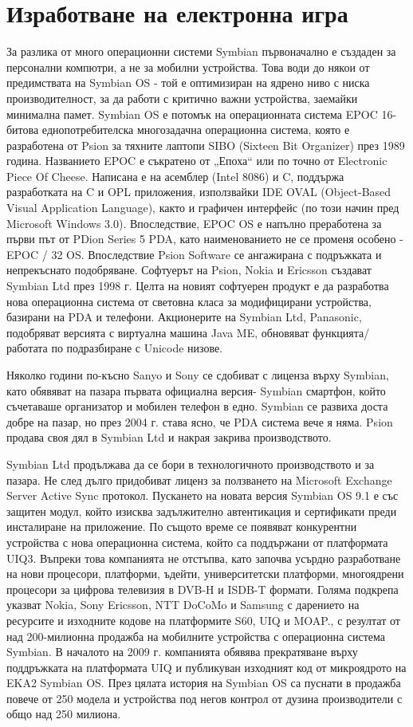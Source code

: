﻿\newpage
\chapter{Изработване на електронна игра}
\label{chapter02}

За разлика от много операционни системи Symbian първоначално е създаден за персонални компютри, а не за мобилни устройства. Това води до някои от предимствата на Symbian OS - той е оптимизиран на ядрено ниво с ниска производителност, за да работи с критично важни устройства, заемайки минимална памет. Symbian OS е потомък на операционната система EPOC 16-битова еднопотребителска многозадачна операционна система, която е разработена от Psion за тяхните лаптопи SIBO (Sixteen Bit Organizer) през 1989 година. Названието EPOC е съкратено от „Епоха“ или по точно от Electronic Piece Of Cheese. Написана е на асемблер (Intel 8086) и C, поддържа разработката на C и OPL приложения, използвайки IDE OVAL (Object-Based Visual Application Language), както и графичен интерфейс (по този начин пред Microsoft Windows 3.0). Впоследствие, EPOC OS е напълно преработена за първи път от PDion Series 5 PDA, като наименованието не се променя особено - EPOC / 32 OS. Впоследствие Psion Software се ангажирана с подръжката и непрекъснато подобряване. Софтуерът на Psion, Nokia и Ericsson създават Symbian Ltd през 1998 г. Целта на новият софтуерен продукт е да разработва нова операционна система от световна класа за модифицирани устройства, базирани на PDA и телефони. Акционерите на Symbian Ltd, Panasonic, подобряват версията с виртуална машина Java ME, обновяват функцията/работата по подразбиране с Unicode низове.

Няколко години по-късно Sanyo и Sony се сдобиват с лиценза върху Symbian, като обявяват на пазара първата официална версия- Symbian смартфон, който съчетаваше организатор и мобилен телефон в едно. Symbian се развиха доста добре на пазар, но през 2004 г. става ясно, че PDA  система вече я няма. Psion продава своя дял в Symbian Ltd и накрая закрива производството. 

Symbian Ltd продължава да се бори в технологичното производството и за пазара. Не след дълго придобиват лиценз за ползването на Microsoft Exchange Server Active Sync протокол. Пускането на новата версия Symbian OS 9.1 е със защитен модул, който изисква задължително автентикация и сертификати преди инсталиране на приложение. По същото време се появяват  конкурентни устройства с нова операционна система, който са поддържани от платформата UIQ3. Въпреки това компанията не отстъпва, като започва усърдно разработване на нови процесори, платформи, ъдейти, университетски платформи, многоядрени процесори за цифрова телевизия в DVB-H и ISDB-T формати. Голяма подкрепа указват Nokia, Sony Ericsson, NTT DoCoMo и Samsung с дарението на ресурсите и изходните кодове на платформите S60, UIQ и MOAP., с резултат от над 200-милионна продажба на мобилните устройства с операционна система Symbian. В началото на 2009 г. компанията обявява прекратяване върху поддръжката на платформата UIQ и публикуван изходният код от микроядрото на EKA2 Symbian OS. През цялата история на Symbian OS са пуснати в продажба повече от 250 модела и устройства под негов контрол от дузина производители с общо над 250 милиона.

